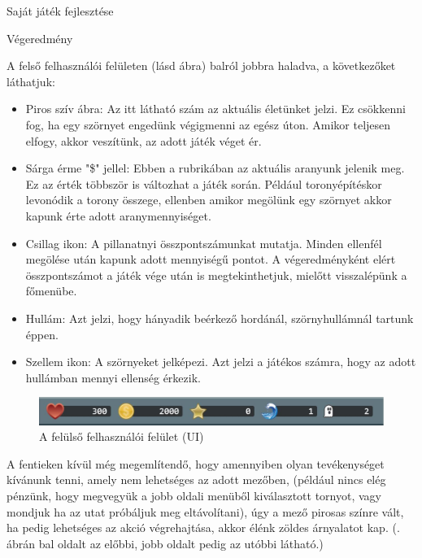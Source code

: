 \begin{MyChapter}{Saját játék fejlesztése}
\begin{MySection}{Végeredmény}
	
		A felső felhasználói felületen (lásd  ábra) balról jobbra haladva, a következőket láthatjuk:
		
		\begin{itemize}
			\item Piros szív ábra: Az itt látható szám az aktuális életünket jelzi. Ez csökkenni fog, ha egy szörnyet engedünk végigmenni az egész úton. Amikor teljesen elfogy, akkor veszítünk, az adott játék véget ér.
			
			\item Sárga érme "\$" jellel: Ebben a rubrikában az aktuális aranyunk jelenik meg. Ez az érték többször is változhat a játék során. Például toronyépítéskor levonódik a torony összege, ellenben amikor megölünk egy szörnyet akkor kapunk érte adott aranymennyiséget.
			
			\item Csillag ikon: A pillanatnyi összpontszámunkat mutatja. Minden ellenfél megölése után kapunk adott mennyiségű pontot. A végeredményként elért összpontszámot a játék vége után is megtekinthetjuk, mielőtt visszalépünk a főmenübe.
			
			\item Hullám: Azt jelzi, hogy hányadik beérkező hordánál, szörnyhullámnál tartunk éppen.
			
			\item Szellem ikon: A szörnyeket jelképezi. Azt jelzi a játékos számra, hogy az adott hullámban mennyi ellenség érkezik.
		\end{itemize}
	
		\begin{figure}[H]
			\centering
			\includegraphics[scale=0.575]{kepek/jatekHasznalat/felso_ui}
			\caption{A felülső felhasználói felület (UI) }
			\label{fig:jatekHasznalat:felso_ui}
		\end{figure}
	
		A fentieken kívül még megemlítendő, hogy amennyiben olyan tevékenységet kívánunk tenni, amely nem lehetséges az adott mezőben, (például nincs elég pénzünk, hogy megvegyük a jobb oldali menüből kiválasztott tornyot, vagy mondjuk ha az utat próbáljuk meg eltávolítani), úgy a mező pirosas színre vált, ha pedig lehetséges az akció végrehajtása, akkor élénk zöldes árnyalatot kap. (. ábrán bal oldalt az előbbi, jobb oldalt pedig az utóbbi látható.)
		

\end{MySection}
\end{MyChapter}
